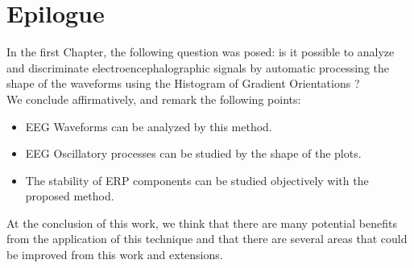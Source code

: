 \chapter{Epilogue}
\label{chapter:seven}


In the first Chapter, the following question was posed:  is it possible to analyze and discriminate electroencephalographic signals by automatic processing the shape of the waveforms using the Histogram of Gradient Orientations ? \\ 


We conclude affirmatively, and remark the following points:

%

\begin{itemize}
\item EEG Waveforms can be analyzed by this method.
\item EEG Oscillatory processes can be studied by the shape of the plots.
\item The stability of ERP components can be studied objectively with the proposed method.
\end{itemize}

At the conclusion of this work, we think that there are many potential benefits from the application of this technique and that there are several areas that could be improved from this work and extensions.   

